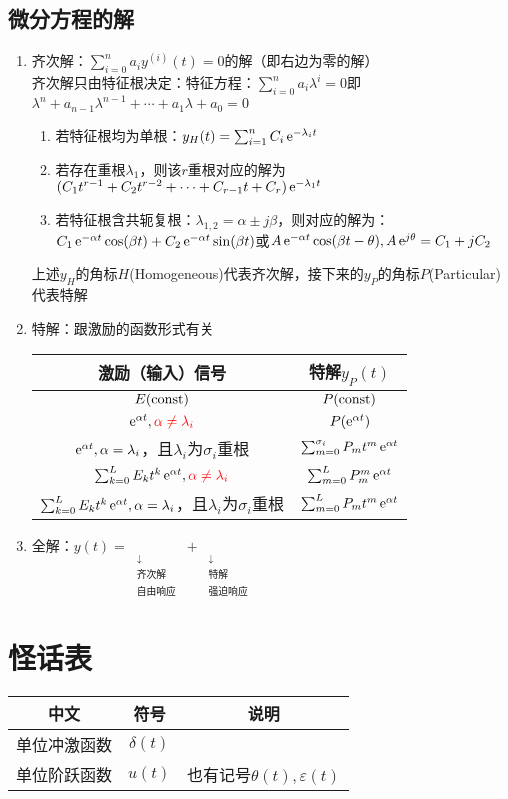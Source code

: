 \documentclass{article}
\begin{document}
\subsection{微分方程的解}
\begin{enumerate}[label=(\arabic*)]
	\item 齐次解：$\sum_{i=0}^{n}a_iy^{(i)}(t) = 0$的解（即右边为零的解）\\
				齐次解只由特征根决定：特征方程：$\sum_{i=0}^{n}a_i\lambda^i = 0$即$\lambda^n+a_{n-1}\lambda^{n-1}+\cdots +a_1\lambda+a_0 = 0$
				\begin{enumerate}[label=(\alph*)]
					\item 若特征根均为单根：$y_{H}(t) = \sum_{i=1}^{n}C_i \operatorname{e}^{-\lambda_i t}$
					\item 若存在重根$\lambda_1$，则该$r$重根对应的解为$(C_1t^{r-1}+C_2t^{r-2}+\cdots +C_{r-1}t+C_r)\operatorname{e}^{-\lambda_1 t}$
					\item 若特征根含共轭复根：$\lambda_{1,2} = \alpha \pm j\beta$，则对应的解为：$C_1\operatorname{e}^{-\alpha t}\cos(\beta t)+C_2\operatorname{e}^{-\alpha t}\sin(\beta t)$或$A\operatorname{e}^{-\alpha t}\cos(\beta t-\theta),A\operatorname{e}^{j\theta}=C_1+jC_2$
				\end{enumerate}
				上述$y_{H}$的角标$H$(Homogeneous)代表齐次解，接下来的$y_{P}$的角标$P$(Particular)代表特解
	\item 特解：跟激励的函数形式有关
				\begin{table}[H]
					\centering
					\renewcommand\arraystretch{1.5}
					\begin{tabular}{c|c}
						\toprule
						激励（输入）信号 & 特解$y_{P}(t)$ \\
						\midrule
						$E(\mathrm{const})$ & $P(\mathrm{const})$ \\
						$\operatorname{e}^{\alpha t},\color{red} \alpha\neq\lambda_{i}$ & $P(\operatorname{e}^{\alpha t})$ \\
						$\operatorname{e}^{\alpha t},\alpha=\lambda_{i}$，且$\lambda_i$为$\sigma_i$重根 & $\sum_{m=0}^{\sigma_i}P_{m}t^{m}\operatorname{e}^{\alpha t}$ \\
						$\sum_{k=0}^{L}E_{k}t^{k}\operatorname{e}^{\alpha t},\color{red} \alpha\neq\lambda_i$ & $\sum_{m=0}^{L}P_{m}^{m}\operatorname{e}^{\alpha t}$ \\
						$\sum_{k=0}^{L}E_{k}t^{k}\operatorname{e}^{\alpha t},\alpha=\lambda_i$，且$\lambda_i$为$\sigma_i$重根 & $\sum_{m=0}^{L}P_{m}t^{m}\operatorname{e}^{\alpha t}$ \\
						\bottomrule
					\end{tabular}
				\end{table}
	\item 全解：$y(t) = \mathop{y_{H}(t)}\limits_{\substack{\downarrow\\ \text{齐次解} \\ \text{自由响应}}} + \mathop{y_{P}(t)}\limits_{\substack{\downarrow\\ \text{特解} \\ \text{强迫响应}}}$
\end{enumerate}

\appendix
\section{怪话表}
\begin{table}[H]
	\centering
	\begin{tabular}{ccc}
		\toprule
		中文 & 符号 & 说明 \\
		\midrule
		单位冲激函数 & $\delta(t)$ &  \\
		单位阶跃函数 & $u(t)$ & 也有记号$\theta(t),\varepsilon(t)$ \\
		\bottomrule
	\end{tabular}
\end{table}
\end{document}
